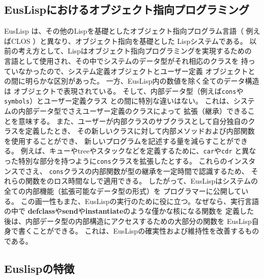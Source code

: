\subsection{EusLispにおけるオブジェクト指向プログラミング}
EusLisp は、その他のLispを基礎としたオブジェクト指向プログラム言語（
例えばCLOS \cite{CLOS:Keene}）と異なり、オブジェクト指向を基礎とした
Lispシステムである。
以前の考え方として、Lispはオブジェクト指向プログラミングを実現するための
言語として使用され、その中でシステムのデータ型がそれ相応のクラスを
持っていなかったので、システム定義オブジェクトとユーザー定義
オブジェクトとの間に明らかな区別があった。
一方、EusLisp内の数値を除く全てのデータ構造は
オブジェクトで表現されている。
そして、内部データ型（例えば{\tt cons}や{\tt symbols}）とユーザー定義クラス
との間に特別な違いはない。
これは、システムの内部データ型でさえユーザー定義のクラスによって
拡張（継承）できることを意味する。
また、ユーザーが内部クラスのサブクラスとして自分独自のクラスを定義したとき、
その新しいクラスに対して内部メソッドおよび内部関数を使用することができ、
新しいプログラムを記述する量を減らすことができる。
例えば、キューやtreeやスタックなどを定義するために、{\tt car}や{\tt cdr}
と異なった特別な部分を持つように{\tt cons}クラスを拡張したとする。
これらのインスタンスでさえ、
{\tt cons}クラスの内部関数が型の継承を一定時間で認識するため、
それらの関数をのロス時間なしで適用できる。
したがって、EusLispはシステムの全ての内部機能（拡張可能なデータ型の形式）を
プログラマーに公開している。
この画一性もまた、EusLispの実行のために役に立つ。なぜなら、実行言語の中で
{\bf defclass}や{\bf send}や{\bf instantiate}のような僅かな核になる関数を
定義した後は、内部データ型の内部構造にアクセスするための大部分の関数を
EusLisp自身で書くことができる。
これは、EusLispの確実性および維持性を改善するものである。

\subsection{Euslispの特徴}

